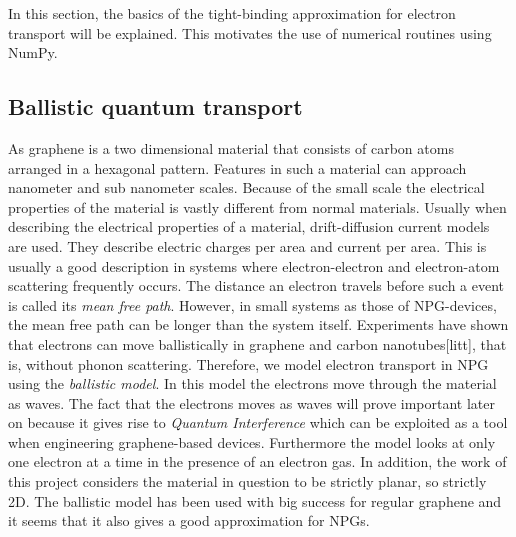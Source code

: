 In this section, the basics of the tight-binding approximation for electron transport will be explained. This motivates the use of numerical routines using NumPy.
\subsection{Ballistic quantum transport}
As graphene is a two dimensional material that consists of carbon atoms arranged in a hexagonal pattern. Features in such a material can approach nanometer and sub nanometer scales. Because of the small scale the electrical properties of the material is vastly different from normal materials. Usually when describing the electrical properties of a material, drift-diffusion current models are used. They describe electric charges per area and current per area. This is usually a good description in systems where electron-electron and electron-atom scattering frequently occurs. The distance an electron travels before such a event is called its \textit{mean free path}. However, in small systems as those of NPG-devices, the mean free path can be longer than the system itself. Experiments have shown that electrons can move ballistically in graphene and carbon nanotubes[litt], that is, without phonon scattering. Therefore, we model electron transport in NPG using the \textit{ballistic model}. In this model the electrons move through the material as waves. The fact that the electrons moves as waves will prove important later on because it gives rise to \textit{Quantum Interference} which can be exploited as a tool when engineering graphene-based devices\cite{markussen_relation_2010}. Furthermore the model looks at only one electron at a time in the presence of an electron gas. In addition, the work of this project considers the material in question to be strictly planar, so strictly 2D.  The ballistic model has been used with big success for regular graphene and it seems that it also gives a good approximation for NPGs.
